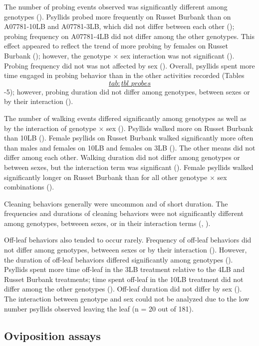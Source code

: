 \documentclass[]{article}
\begin{document}
The number of probing events observed was significantly different among
genotypes (). Psyllids probed more frequently on Russet Burbank than on
A07781-10LB and A07781-3LB, which did not differ between each other ();
probing frequency on A07781-4LB did not differ among the other
genotypes. This effect appeared to reflect the trend of more probing by
females on Russet Burbank (); however, the genotype \(\times\) sex
interaction was not significant (). Probing frequency did not was not
affected by sex (). Overall, psyllids spent more time engaged in probing
behavior than in the other activities recorded (Tables
\protect\hyperlink{tab:tbl_probes}{\[tab:tbl\_probes\]}-5); however,
probing duration did not differ among genotypes, between sexes or by
their interaction ().

The number of walking events differed significantly among genotypes as
well as by the interaction of genotype \(\times\) sex (). Psyllids
walked more on Russet Burbank than 10LB (). Female psyllids on Russet
Burbank walked significantly more often than males and females on 10LB
and females on 3LB (). The other means did not differ among each other.
Walking duration did not differ among genotypes or between sexes, but
the interaction term was significant (). Female psyllids walked
significantly longer on Russet Burbank than for all other genotype
\(\times\) sex combinations ().

Cleaning behaviors generally were uncommon and of short duration. The
frequencies and durations of cleaning behaviors were not significantly
different among genotypes, betweeen sexes, or in their interaction terms
(, ).

Off-leaf behaviors also tended to occur rarely. Frequency of off-leaf
behaviors did not differ among genotypes, betweeen sexes or by their
interaction (). However, the duration of off-leaf behaviors differed
significantly among genotypes (). Psyllids spent more time off-leaf in
the 3LB treatment relative to the 4LB and Russet Burbank treatments;
time spent off-leaf in the 10LB treatment did not differ among the other
genotypes (). Off-leaf duration did not differ by sex (). The
interaction between genotype and sex could not be analyzed due to the
low number psyllids observed leaving the leaf (n = 20 out of 181).

\hypertarget{sec:results_fecund}{%
\subsection{Oviposition assays}\label{sec:results_fecund}}
\end{document}
